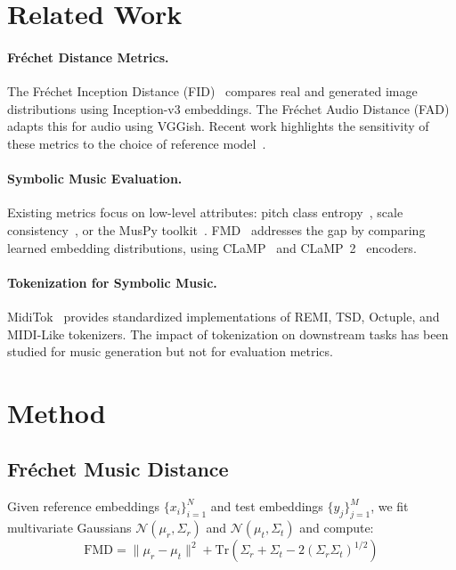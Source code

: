 \documentclass[a4paper]{article}
\begin{document}
\section{Related Work}
\label{sec:related}

\paragraph{Fréchet Distance Metrics.}
The Fréchet Inception Distance (FID)~\citep{heusel2017gans} compares real and generated image distributions using Inception-v3 embeddings. The Fréchet Audio Distance (FAD)~\citep{kilgour2018fad} adapts this for audio using VGGish. Recent work highlights the sensitivity of these metrics to the choice of reference model~\citep{gui2024adapting,tailleur2024correlation}.

\paragraph{Symbolic Music Evaluation.}
Existing metrics focus on low-level attributes: pitch class entropy~\citep{wu2020jazz}, scale consistency~\citep{mogren2016crnngan}, or the MusPy toolkit~\citep{dong2020muspy}. FMD~\citep{retkowski2025fmd} addresses the gap by comparing learned embedding distributions, using CLaMP~\citep{wu2023clamp} and CLaMP~2~\citep{wu2024clamp2} encoders.

\paragraph{Tokenization for Symbolic Music.}
MidiTok~\citep{fradet2024miditok} provides standardized implementations of REMI, TSD, Octuple, and MIDI-Like tokenizers. The impact of tokenization on downstream tasks has been studied for music generation but not for evaluation metrics.

\section{Method}
\label{sec:method}

\subsection{Fréchet Music Distance}

Given reference embeddings $\{x_i\}_{i=1}^N$ and test embeddings $\{y_j\}_{j=1}^M$, we fit multivariate Gaussians $\mathcal{N}(\mu_r, \Sigma_r)$ and $\mathcal{N}(\mu_t, \Sigma_t)$ and compute:
\begin{equation}
\text{FMD} = \|\mu_r - \mu_t\|^2 + \text{Tr}\!\left(\Sigma_r + \Sigma_t - 2(\Sigma_r \Sigma_t)^{1/2}\right)
\end{equation}
\end{document}
